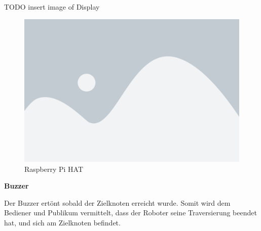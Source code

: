 TODO insert image of Display
\begin{figure}[H]
    \centering
    \includegraphics[width=0.5\linewidth]{assets/placeholder.png}
    \caption{Raspberry Pi HAT}
    \label{fig:raspiheader-assembly}
\end{figure}


\textbf{Buzzer}\label{peripherie-buzzer}

Der Buzzer ertönt sobald der Zielknoten erreicht wurde. Somit wird dem Bediener und Publikum vermittelt, dass der Roboter seine Traversierung beendet hat, und sich am Zielknoten befindet.
